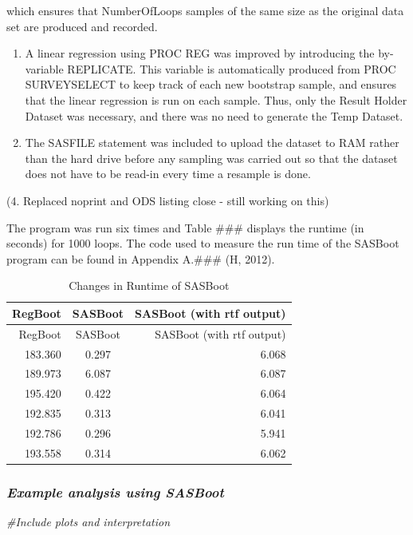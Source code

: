 \documentclass[]{article}
\newenvironment{Shaded}{\begin{snugshade}}{\end{snugshade}}
\newcommand{\CommentTok}[1]{\textcolor[rgb]{0.56,0.35,0.01}{\textit{#1}}}
\begin{document}
which ensures that NumberOfLoops samples of the same size as the
original data set are produced and recorded.

\begin{enumerate}
\def\labelenumi{\arabic{enumi}.}
\setcounter{enumi}{1}
\item
  A linear regression using PROC REG was improved by introducing the
  by-variable REPLICATE. This variable is automatically produced from
  PROC SURVEYSELECT to keep track of each new bootstrap sample, and
  ensures that the linear regression is run on each sample. Thus, only
  the Result Holder Dataset was necessary, and there was no need to
  generate the Temp Dataset.
\item
  The SASFILE statement was included to upload the dataset to RAM rather
  than the hard drive before any sampling was carried out so that the
  dataset does not have to be read-in every time a resample is done.
\end{enumerate}

(4. Replaced noprint and ODS listing close - still working on this)

The program was run six times and Table \#\#\# displays the runtime (in
seconds) for 1000 loops. The code used to measure the run time of the
SASBoot program can be found in Appendix A.\#\#\# (H, 2012).

\begin{longtable}[]{@{}rcr@{}}
\caption{Changes in Runtime of SASBoot}\tabularnewline
\toprule
RegBoot & SASBoot & SASBoot (with rtf output)\tabularnewline
\midrule
\endfirsthead
\toprule
RegBoot & SASBoot & SASBoot (with rtf output)\tabularnewline
\midrule
\endhead
183.360 & 0.297 & 6.068\tabularnewline
189.973 & 6.087 & 6.087\tabularnewline
195.420 & 0.422 & 6.064\tabularnewline
192.835 & 0.313 & 6.041\tabularnewline
192.786 & 0.296 & 5.941\tabularnewline
193.558 & 0.314 & 6.062\tabularnewline
\bottomrule
\end{longtable}

\subsubsection{\texorpdfstring{\emph{Example analysis using
SASBoot}}{Example analysis using SASBoot}}\label{example-analysis-using-sasboot}

\begin{Shaded}
\begin{Highlighting}[]
\CommentTok{#Include plots and interpretation}
\end{Highlighting}
\end{Shaded}
\end{document}
